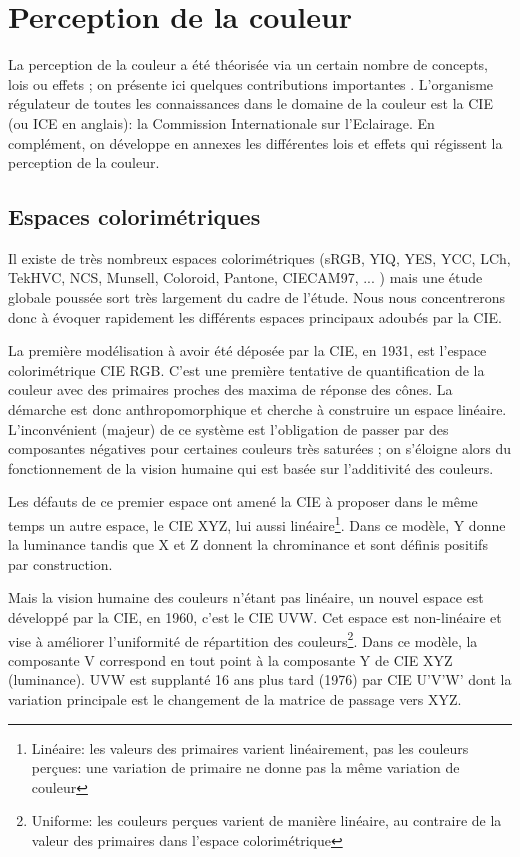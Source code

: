 \chapter{Perception de la couleur}
	\par La perception de la couleur a été théorisée via un certain nombre de concepts, lois ou effets ; on présente ici quelques contributions importantes \citep{le_grand_optique_1972, wyszecki_color_2000,judd_color_1975}. L'organisme régulateur de toutes les connaissances dans le domaine de la couleur est la CIE (ou ICE en anglais): la Commission Internationale sur l'Eclairage. En complément, on développe en annexes les différentes lois et effets qui régissent la perception de la couleur.
	
	\section{Espaces colorimétriques}
	\par Il existe de très nombreux espaces colorimétriques (sRGB, YIQ, YES, YCC, LCh, TekHVC, NCS, Munsell, Coloroid, Pantone, CIECAM97, ... \citep{beretta_understanding_2000}) mais une étude globale poussée sort très largement du cadre de l'étude. Nous nous concentrerons donc à évoquer rapidement les différents espaces principaux adoubés par la CIE.
	
	\par La première modélisation à avoir été déposée par la CIE, en 1931, est l'espace colorimétrique CIE RGB. C'est une première tentative de quantification de la couleur avec des primaires proches des maxima de réponse des cônes. La démarche est donc anthropomorphique et cherche à construire un espace linéaire. L'inconvénient (majeur) de ce système est l'obligation de passer par des composantes négatives pour certaines couleurs très saturées ; on s'éloigne alors du fonctionnement de la vision humaine qui est basée sur l'additivité des couleurs.
	
	\par Les défauts de ce premier espace ont amené la CIE à proposer dans le même temps un autre espace, le CIE XYZ, lui aussi linéaire\footnote{Linéaire: les valeurs des primaires varient linéairement, pas les couleurs perçues: une variation de primaire ne donne pas la même variation de couleur}. Dans ce modèle, Y donne	la luminance tandis que X et Z donnent la chrominance et sont définis positifs par construction.
	
	\par Mais la vision humaine des couleurs n'étant pas linéaire, un nouvel espace est développé par la CIE, en 1960, c'est le CIE UVW. Cet espace est non-linéaire et vise à améliorer l'uniformité de répartition des couleurs\footnote{Uniforme: les couleurs perçues varient de manière linéaire, au contraire de la valeur des primaires dans l'espace colorimétrique}. Dans ce modèle, la composante V correspond en tout point à la composante Y de CIE XYZ (luminance). UVW est supplanté 16 ans plus tard (1976) par CIE U'V'W' dont la variation principale est le changement de la matrice de passage vers XYZ.
	
